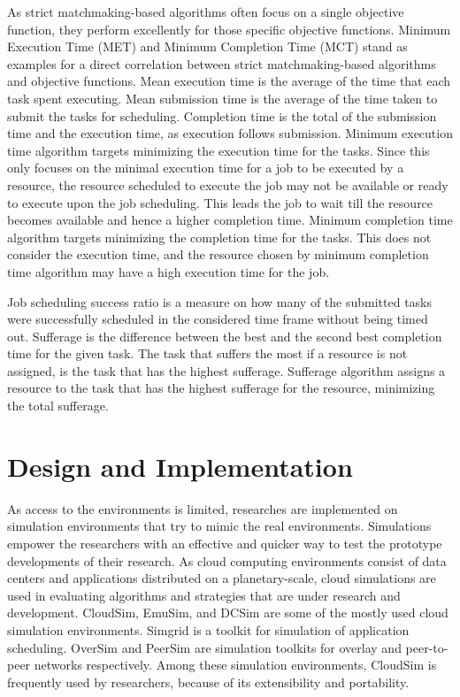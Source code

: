 \documentclass{llncs}
\begin{document}
As strict matchmaking-based algorithms often focus on a single objective function, they perform excellently for those specific objective functions. Minimum Execution Time (MET) and Minimum Completion Time (MCT) stand as examples for a direct correlation between strict matchmaking-based algorithms and objective functions. Mean execution time is the average of the time that each task spent executing. Mean submission time is the average of the time taken to submit the tasks for scheduling. Completion time is the total of the submission time and the execution time, as execution follows submission. Minimum execution time algorithm targets minimizing the execution time for the tasks. Since this only focuses on the minimal execution time for a job to be executed by a resource, the resource scheduled to execute the job may not be available or ready to execute upon the job scheduling\cite{mahes}. This leads the job to wait till the resource becomes available and hence a higher completion time. Minimum completion time algorithm targets minimizing the completion time for the tasks. This does not consider the execution time, and the resource chosen by minimum completion time algorithm may have a high execution time for the job\cite{mahes}.

Job scheduling success ratio is a measure on how many of the submitted tasks were successfully scheduled in the considered time frame without being timed out. Sufferage is the difference between the best and the second best completion time for the given task\cite{sufferage}. The task that suffers the most if a resource is not assigned, is the task that has the highest sufferage. Sufferage algorithm assigns a resource to the task that has the highest sufferage for the resource, minimizing the total sufferage.

\section{Design and Implementation}
As access to the environments is limited, researches are implemented on simulation environments that try to mimic the real environments. Simulations empower the researchers with an effective and quicker way to test the prototype developments of their research. As cloud computing environments consist of data centers and applications distributed on a planetary-scale, cloud simulations are used in evaluating algorithms and strategies that are under research and development. CloudSim, EmuSim\cite{emusim}, and DCSim\cite{dcsim} are some of the mostly used cloud simulation environments. Simgrid\cite{simgrid} is a toolkit for simulation of application scheduling. OverSim\cite{oversim} and PeerSim\cite{peersim} are simulation toolkits for overlay and peer-to-peer networks respectively. Among these simulation environments, CloudSim is frequently used by researchers, because of its extensibility and portability.
\end{document}
